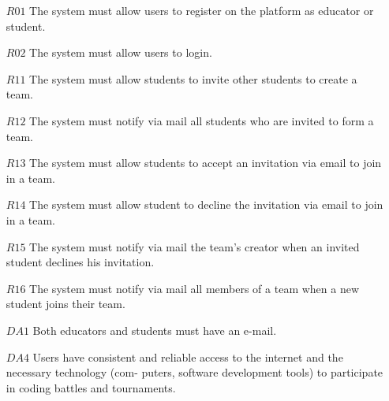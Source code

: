 \begin{itemize}
    \item [$R01$] The system must allow users to register on the platform as educator or student.
    \item [$R02$]The system must allow users to login.
    \item [$R11$]The system must allow students to invite other students to create a team.
    \item [$R12$]  The system must notify via mail all students who are invited to form a team.
    \item [$R13$] The system must allow students to accept an invitation via email to join in a team.
     \item [$R14$]The system must allow student to decline the invitation via email to join in a team.
     \item [$R15$]The system must notify via mail the team’s creator when an invited student declines his invitation.
     \item [$R16$] The system must notify via mail all members of a team when a new student joins their team.
    \item [$DA1$] Both educators and students must have an e-mail.
    \item [$DA4$] Users have consistent and reliable access to the internet and the necessary technology (com-
puters, software development tools) to participate in coding battles and tournaments.
   
\end{itemize}

